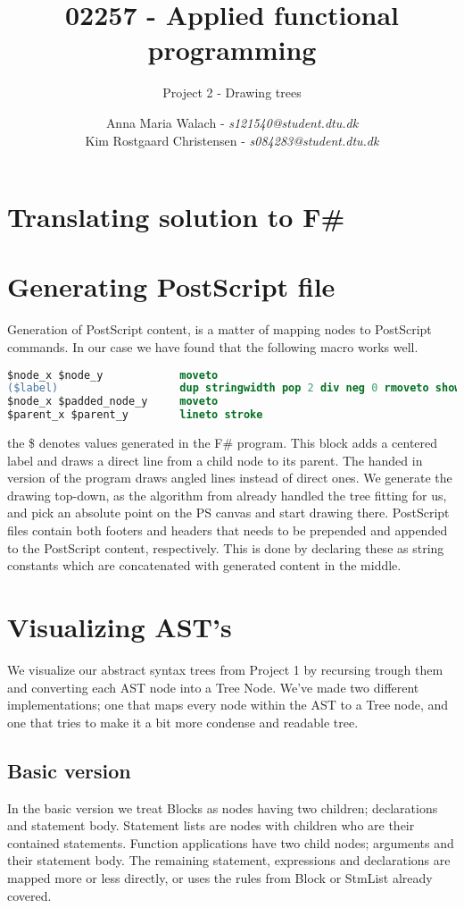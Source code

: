 \documentclass[10pt]{scrartcl}
\title{02257 - Applied functional programming}
\subtitle{Project 2 - Drawing trees}
\author{Anna Maria Walach - \textit {s121540@student.dtu.dk} \\ Kim Rostgaard Christensen - \textit {s084283@student.dtu.dk}}
\begin{document}
\maketitle
\section{Translating solution to F\#}
\section{Generating PostScript file}
Generation of PostScript content, is a matter of mapping nodes to PostScript commands. In our case we have found that the following macro works well.
\begin{lstlisting}[language=PostScript]
$node_x $node_y            moveto
($label)                   dup stringwidth pop 2 div neg 0 rmoveto show
$node_x $padded_node_y     moveto
$parent_x $parent_y        lineto stroke
\end{lstlisting}
the \$ denotes values generated in the F\# program. This block adds a centered label and draws a direct line from a child node to its parent. The handed in version of the program draws angled lines instead of direct ones.
We generate the drawing top-down, as the algorithm from \cite{kennedy1996functional} already handled the tree fitting for us, and pick an absolute point on the PS canvas and start drawing there.
PostScript files contain both footers and headers that needs to be prepended and appended to the PostScript content, respectively. This is done by declaring these as string constants which are concatenated with generated content in the middle.
\section{Visualizing AST's}
We visualize our abstract syntax trees from Project 1 by recursing trough them and converting each AST node into a Tree Node. We've made two different implementations; one that maps every node within the AST to a Tree node, and one that tries to make it a bit more condense and readable tree. 
\subsection{Basic version}
In the basic version we treat Blocks as nodes having two children; declarations and statement body. Statement lists are nodes with children who are their contained statements. Function applications have two child nodes; arguments and their statement body. The remaining statement, expressions and declarations are mapped more or less directly, or uses the rules from Block or StmList already covered.
\end{document}
